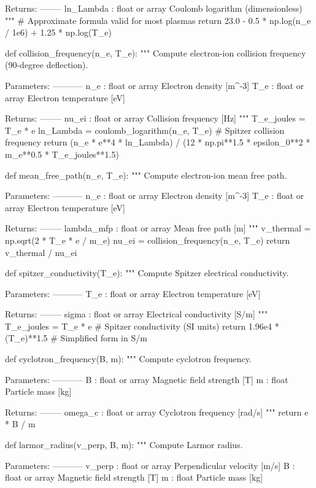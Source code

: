 \documentclass[11pt,a4paper]{article}
\begin{document}
\begin{pycode}
    Returns:
    --------
    ln_Lambda : float or array
        Coulomb logarithm (dimensionless)
    """
    # Approximate formula valid for most plasmas
    return 23.0 - 0.5 * np.log(n_e / 1e6) + 1.25 * np.log(T_e)

def collision_frequency(n_e, T_e):
    """
    Compute electron-ion collision frequency (90-degree deflection).

    Parameters:
    -----------
    n_e : float or array
        Electron density [m^-3]
    T_e : float or array
        Electron temperature [eV]

    Returns:
    --------
    nu_ei : float or array
        Collision frequency [Hz]
    """
    T_e_joules = T_e * e
    ln_Lambda = coulomb_logarithm(n_e, T_e)
    # Spitzer collision frequency
    return (n_e * e**4 * ln_Lambda) / (12 * np.pi**1.5 * epsilon_0**2 * m_e**0.5 * T_e_joules**1.5)

def mean_free_path(n_e, T_e):
    """
    Compute electron-ion mean free path.

    Parameters:
    -----------
    n_e : float or array
        Electron density [m^-3]
    T_e : float or array
        Electron temperature [eV]

    Returns:
    --------
    lambda_mfp : float or array
        Mean free path [m]
    """
    v_thermal = np.sqrt(2 * T_e * e / m_e)
    nu_ei = collision_frequency(n_e, T_e)
    return v_thermal / nu_ei

def spitzer_conductivity(T_e):
    """
    Compute Spitzer electrical conductivity.

    Parameters:
    -----------
    T_e : float or array
        Electron temperature [eV]

    Returns:
    --------
    sigma : float or array
        Electrical conductivity [S/m]
    """
    T_e_joules = T_e * e
    # Spitzer conductivity (SI units)
    return 1.96e4 * (T_e)**1.5  # Simplified form in S/m

def cyclotron_frequency(B, m):
    """
    Compute cyclotron frequency.

    Parameters:
    -----------
    B : float or array
        Magnetic field strength [T]
    m : float
        Particle mass [kg]

    Returns:
    --------
    omega_c : float or array
        Cyclotron frequency [rad/s]
    """
    return e * B / m

def larmor_radius(v_perp, B, m):
    """
    Compute Larmor radius.

    Parameters:
    -----------
    v_perp : float or array
        Perpendicular velocity [m/s]
    B : float or array
        Magnetic field strength [T]
    m : float
        Particle mass [kg]


\end{pycode}
\end{document}
